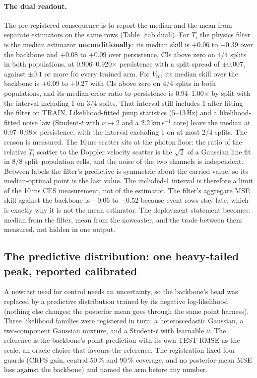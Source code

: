 \documentclass[10pt]{article}
\newcommand{\Ti}{\ensuremath{T_i}}
\newcommand{\Vrot}{\ensuremath{V_\mathrm{rot}}}
\begin{document}
\paragraph{The dual readout.} The pre-registered consequence is to report the median
and the mean from separate estimators on the same rows (Table~\ref{tab:dual}). For
\Ti{} the physics filter is the median estimator \textbf{unconditionally}: its median
skill is $+0.06$ to $+0.39$ over the backbone and $+0.08$ to $+0.09$ over persistence,
CIs above zero on 4/4 splits in both populations, at 0.906--0.920$\times$
persistence with a split spread of $\pm0.007$, against $\pm0.1$ or more for every
trained arm. For \Vrot{} its median skill over the backbone is $+0.09$ to $+0.27$ with
CIs above zero on 4/4 splits in both populations, and its median-error ratio to
persistence is 0.94--1.00$\times$ by split with the interval including 1 on 3/4 splits.
That interval still includes 1 after fitting the filter on TRAIN. Likelihood-fitted jump statistics
(5--13\,Hz) and a likelihood-fitted noise law (Student-$t$ with $\nu\to2$ and a
2.2\,km\,s$^{-1}$ core) leave the median at 0.97--0.98$\times$ persistence, with
the interval excluding 1 on at most 2/4 splits. The reason is measured. The 10\,ms scatter
sits at the photon floor: the ratio of the relative \Ti{} scatter to the Doppler
velocity scatter is the $\sqrt2$ of a Gaussian line fit in 8/8 split--population
cells, and the noise of the two channels is independent. Between labels the filter's
predictive is symmetric about the carried value, so its median-optimal point is the
last value. The included-1 interval is therefore a limit of the 10\,ms CES measurement, not of the
estimator. The
filter's aggregate MSE skill against the backbone is $-0.06$ to $-0.52$ because event
rows stay late, which is exactly why it is not the mean estimator. The deployment
statement becomes: median from the filter, mean from the nowcaster, and the trade
between them measured, not hidden in one output.

\subsection{The predictive distribution: one heavy-tailed peak, reported calibrated}
\label{sec:dist}

A nowcast used for control needs an uncertainty, so the backbone's head was replaced
by a predictive distribution trained by its negative log-likelihood (nothing else
changes; the posterior mean goes through the same point harness). Three likelihood
families were registered in turn: a heteroscedastic Gaussian, a two-component
Gaussian mixture, and a Student-$t$ with learnable $\nu$. The reference is the
backbone's point prediction with its own TEST RMSE as the scale, an oracle choice
that favours the reference. The registration fixed four guards (CRPS gain, central
50\,\% and 90\,\% coverage, and no posterior-mean MSE loss against the backbone)
and named the arm before any number.
\end{document}
